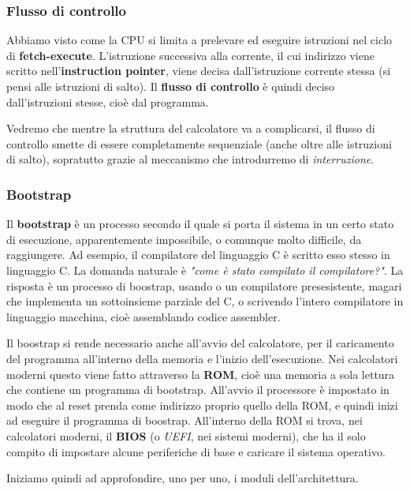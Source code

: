 \documentclass[a4paper,11pt]{article}
\begin{document}
\subsubsection{Flusso di controllo}
Abbiamo visto come la CPU si limita a prelevare ed eseguire istruzioni nel ciclo di \textbf{fetch-execute}.
L'istruzione successiva alla corrente, il cui indirizzo viene scritto nell'\textbf{instruction pointer}, viene decisa dall'istruzione corrente stessa (si pensi alle istruzioni di salto).
Il \textbf{flusso di controllo} è quindi deciso dall'istruzioni stesse, cioè dal programma.

Vedremo che mentre la struttura del calcolatore va a complicarsi, il flusso di controllo smette di essere completamente sequenziale (anche oltre alle istruzioni di salto), sopratutto grazie al meccanismo che introdurremo di \textit{interruzione}. 

\subsubsection{Bootstrap}
Il \textbf{bootstrap} è un processo secondo il quale si porta il sistema in un certo stato di esecuzione, apparentemente impossibile, o comunque molto difficile, da raggiungere.
Ad esempio, il compilatore del linguaggio C è scritto esso stesso in linguaggio C.
La domanda naturale è \textit{"come è stato compilato il compilatore?"}.
La risposta è un processo di boostrap, usando o un compilatore presesistente, magari che implementa un sottoinsieme parziale del C, o scrivendo l'intero compilatore in linguaggio macchina, cioè assemblando codice assembler.

Il boostrap si rende necessario anche all'avvio del calcolatore, per il caricamento del programma all'interno della memoria e l'inizio dell'esecuzione.
Nei calcolatori moderni questo viene fatto attraverso la \textbf{ROM}, cioè una memoria a sola lettura che contiene un programma di bootstrap.
All'avvio il processore è impostato in modo che al reset prenda come indirizzo proprio quello della ROM, e quindi inizi ad eseguire il programma di boostrap.
All'interno della ROM si trova, nei calcolatori moderni, il \textbf{BIOS} (o \textit{UEFI}, nei sistemi moderni), che ha il solo compito di impostare alcune periferiche di base e caricare il sistema operativo.

\par\medskip 

Iniziamo quindi ad approfondire, uno per uno, i moduli dell'architettura.
\end{document}
